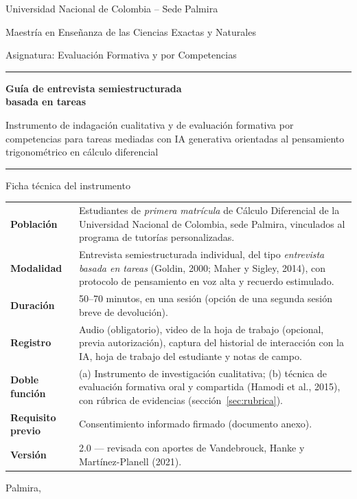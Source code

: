 \documentclass[11pt,letterpaper]{article}
\begin{document}
\begin{titlepage}
\centering
{\large Universidad Nacional de Colombia -- Sede Palmira\par}
{\normalsize Maestría en Enseñanza de las Ciencias Exactas y Naturales\par}
{\normalsize Asignatura: Evaluación Formativa y por Competencias\par}
\vspace{2.2cm}
{\color{unalverde}\rule{\linewidth}{1pt}\par}
\vspace{0.4cm}
{\LARGE\bfseries Guía de entrevista semiestructurada\\[4pt] basada en tareas\par}
\vspace{0.4cm}
{\large Instrumento de indagación cualitativa y de evaluación formativa por competencias para tareas mediadas con IA generativa orientadas al pensamiento trigonométrico en cálculo diferencial\par}
\vspace{0.4cm}
{\color{unalverde}\rule{\linewidth}{1pt}\par}
\vspace{1.5cm}

\begin{caja}{Ficha técnica del instrumento}
\small
\begin{tabularx}{\linewidth}{@{}>{\bfseries}p{3.9cm}L@{}}
Población & Estudiantes de \emph{primera matrícula} de Cálculo Diferencial de la Universidad Nacional de Colombia, sede Palmira, vinculados al programa de tutorías personalizadas.\\
Modalidad & Entrevista semiestructurada individual, del tipo \emph{entrevista basada en tareas} (Goldin, 2000; Maher y Sigley, 2014), con protocolo de pensamiento en voz alta y recuerdo estimulado.\\
Duración & 50--70 minutos, en una sesión (opción de una segunda sesión breve de devolución).\\
Registro & Audio (obligatorio), video de la hoja de trabajo (opcional, previa autorización), captura del historial de interacción con la IA, hoja de trabajo del estudiante y notas de campo.\\
Doble función & (a) Instrumento de investigación cualitativa; (b) técnica de evaluación formativa oral y compartida (Hamodi et al., 2015), con rúbrica de evidencias (sección~\ref{sec:rubrica}).\\
Requisito previo & Consentimiento informado firmado (documento anexo).\\
Versión & 2.0 --- revisada con aportes de Vandebrouck, Hanke y Martínez-Planell (2021).
\end{tabularx}
\end{caja}
\vfill
{\small Palmira, \the\year\par}
\end{titlepage}
\end{document}
